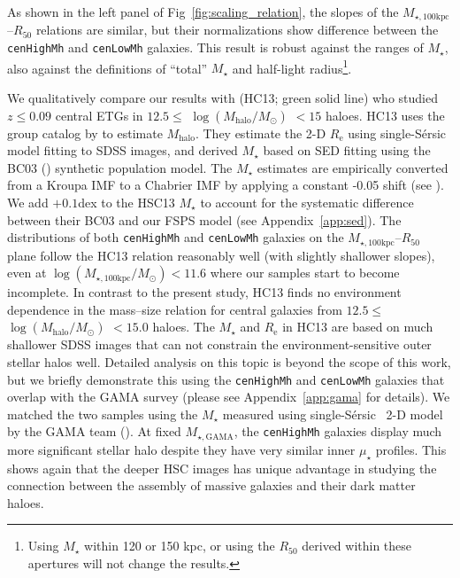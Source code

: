 \documentclass[a4paper,fleqn,usenatbib]{mnras}
\def\ser{{S\'{e}rsic\ }}
\def\rbcg{\texttt{cenHighMh}}
\def\nbcg{\texttt{cenLowMh}}
\def\mstar{{$M_{\star}$}}
\def\mhalo{{$M_{\mathrm{halo}}$}}
\def\logmh{{$\log (M_{\mathrm{halo}}/M_{\odot})$}}
\def\mtot{{$M_{\star,100\mathrm{kpc}}$}}
\def\mgama{{$M_{\star,\mathrm{GAMA}}$}}
\def\logmtot{{$\log (M_{\star,100\mathrm{kpc}}/M_{\odot})$}}
\def\mden{{$\mu_{\star}$}}
\begin{document}
    \noindent As shown in the left panel of Fig~\ref{fig:scaling_relation}, the slopes 
    of the \mtot{}--$R_{\mathrm{50}}$ relations are similar, but their normalizations 
    show difference between the \rbcg{} and \nbcg{} galaxies. 
    This result is robust against the ranges of \mstar{}, also against the definitions 
    of  ``total'' \mstar{} and half-light radius\footnote{Using \mstar{} within 120 or 
    150 kpc, or using the $R_{\mathrm{50}}$ derived within these apertures will not 
    change the results.}.
    
    We qualitatively compare our results with \citealt{HCompany13} (HC13; 
    green solid line) who studied $z\leq 0.09$ central ETGs in 
    $12.5 \le$ \logmh{} $< 15$ haloes. 
    HC13 uses the group catalog by \citet{Yang2007} to estimate \mhalo{}. 
    They estimate the 2-D $R_{\mathrm{e}}$ using single-\ser{} model fitting to SDSS 
    images, and derived \mstar{} based on SED fitting using the BC03 (\citealt{BC03}) 
    synthetic population model. 
    The \mstar{} estimates are empirically converted from a Kroupa IMF to a Chabrier 
    IMF by applying a constant -0.05 shift (see \citealt{Bernardi2016}).
    We add $+0.1$dex to the HSC13 \mstar{} to account for the systematic 
    difference between their BC03 and our FSPS model (see Appendix~\ref{app:sed}). 
    The distributions of both \rbcg{} and \nbcg{} galaxies on the 
    \mtot{}--$R_{\mathrm{50}}$ plane follow the HC13 relation reasonably well 
    (with slightly shallower slopes), even at \logmtot{}$< 11.6$ where our samples 
    start to become incomplete. 
    In contrast to the present study, HC13 finds no environment dependence in the 
    mass--size relation for central galaxies from $12.5\le$ \logmh{} $<15.0$ haloes.
    The \mstar{} and $R_{\mathrm{e}}$ in HC13 are based on much shallower SDSS images
    that can not constrain the environment-sensitive outer stellar halos well. 
    Detailed analysis on this topic is beyond the scope of this work, but we briefly 
    demonstrate this using the \rbcg{} and \nbcg{} galaxies that overlap with the GAMA
    survey (please see Appendix~\ref{app:gama} for details). 
    We matched the two samples using the \mstar{} measured using single-\ser{} 2-D
    model by the GAMA team (\citealt{Kelvin2012}). 
    At fixed \mgama{}, the \rbcg{} galaxies display much more significant stellar 
    halo despite they have very similar inner \mden{} profiles.  
    This shows again that the deeper HSC images has unique advantage in studying the
    connection between the assembly of massive galaxies and their dark matter haloes. 
\end{document}
